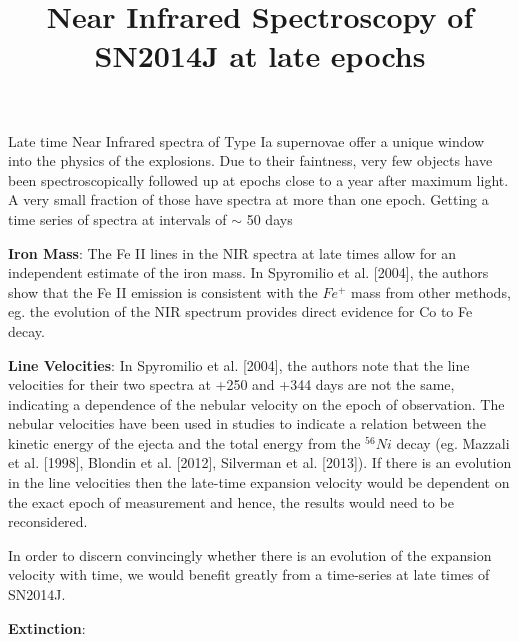 
\title{Near Infrared Spectroscopy of SN2014J at late epochs}
\maketitle
Late time Near Infrared spectra of Type Ia supernovae offer a unique window into the physics of the explosions. Due to their faintness, very few objects have been spectroscopically followed up at epochs close to a year after maximum light. A very small fraction of those have spectra at more than one epoch.
Getting a time series of spectra at intervals of $\sim$ 50 days 

\textbf{Iron Mass}:
The Fe II lines in the NIR spectra at late times allow for an independent estimate of the iron mass. In Spyromilio et al. [2004], the authors show that the Fe II emission is consistent with the $Fe^{+}$  mass from other methods, eg. 
the evolution of the NIR spectrum provides  direct evidence for Co to Fe decay. 

\textbf{Line Velocities}:
In Spyromilio et al. [2004], the authors note that the line velocities for their two spectra at +250 and +344 days are not the same, indicating a dependence of the nebular velocity on the epoch of observation. The nebular velocities have been used in studies to indicate a relation between the kinetic energy of the ejecta and the total energy from the $^{56} Ni$ decay (eg. Mazzali et al. [1998], Blondin et al. [2012], Silverman et al. [2013]). If there is an evolution in the line velocities then the late-time expansion velocity would be dependent on the exact epoch of measurement and hence, the results would need to be reconsidered. 

In order to discern convincingly whether there is an evolution of the expansion velocity with time, we would benefit greatly from a time-series at late times of SN2014J.  

\textbf{Extinction}:
